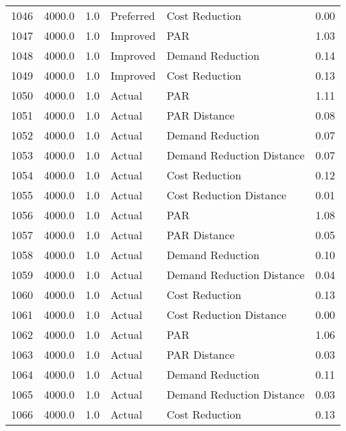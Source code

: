 \begin{longtable}{lrrllr}
1046 &       4000.0 &     1.0 &      Preferred &             Cost Reduction &   0.00 \\
1047 &       4000.0 &     1.0 &       Improved &                        PAR &   1.03 \\
1048 &       4000.0 &     1.0 &       Improved &           Demand Reduction &   0.14 \\
1049 &       4000.0 &     1.0 &       Improved &             Cost Reduction &   0.13 \\
1050 &       4000.0 &     1.0 &         Actual &                        PAR &   1.11 \\
1051 &       4000.0 &     1.0 &         Actual &               PAR Distance &   0.08 \\
1052 &       4000.0 &     1.0 &         Actual &           Demand Reduction &   0.07 \\
1053 &       4000.0 &     1.0 &         Actual &  Demand Reduction Distance &   0.07 \\
1054 &       4000.0 &     1.0 &         Actual &             Cost Reduction &   0.12 \\
1055 &       4000.0 &     1.0 &         Actual &    Cost Reduction Distance &   0.01 \\
1056 &       4000.0 &     1.0 &         Actual &                        PAR &   1.08 \\
1057 &       4000.0 &     1.0 &         Actual &               PAR Distance &   0.05 \\
1058 &       4000.0 &     1.0 &         Actual &           Demand Reduction &   0.10 \\
1059 &       4000.0 &     1.0 &         Actual &  Demand Reduction Distance &   0.04 \\
1060 &       4000.0 &     1.0 &         Actual &             Cost Reduction &   0.13 \\
1061 &       4000.0 &     1.0 &         Actual &    Cost Reduction Distance &   0.00 \\
1062 &       4000.0 &     1.0 &         Actual &                        PAR &   1.06 \\
1063 &       4000.0 &     1.0 &         Actual &               PAR Distance &   0.03 \\
1064 &       4000.0 &     1.0 &         Actual &           Demand Reduction &   0.11 \\
1065 &       4000.0 &     1.0 &         Actual &  Demand Reduction Distance &   0.03 \\
1066 &       4000.0 &     1.0 &         Actual &             Cost Reduction &   0.13 \\

\end{longtable}
